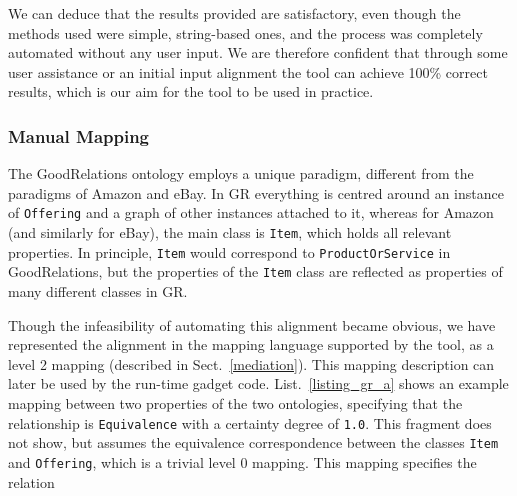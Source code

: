 We can deduce that the results provided are satisfactory, even though the methods used were simple, string-based ones, and the process was completely automated without any user input.
We are therefore confident that through some user assistance or an initial input alignment the tool can achieve 100\% correct results, which is our aim for the tool to be used in practice.



\subsubsection{Manual Mapping} %
\label{sub:manual_mapping}

The GoodRelations ontology employs a unique paradigm, different from the paradigms of Amazon and eBay. In GR everything is centred around an instance of \texttt{Offering} and a graph of other instances attached to it, whereas for Amazon (and similarly for eBay), the main class is \texttt{Item}, which holds all relevant properties. In principle, \texttt{Item} would correspond to \texttt{ProductOrService} in GoodRelations, but the properties of the \texttt{Item} class are reflected as properties of many different classes in GR. 

Though the infeasibility of automating this alignment became obvious, we have represented the alignment in the mapping language supported by the tool, as a level 2 mapping (described in Sect.~\ref{mediation}).
This mapping description can later be used by the run-time gadget code. List.~\ref{listing_gr_a} shows an example mapping between two properties of the two ontologies, specifying that the relationship is \texttt{Equivalence} with a certainty degree of \texttt{1.0}. This fragment does not show, but assumes the equivalence correspondence between the classes \texttt{Item} and \texttt{Offering}, which is a trivial level 0 mapping. This mapping specifies the relation

